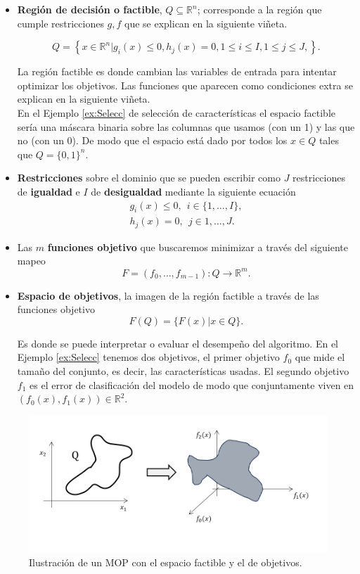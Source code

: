 \begin{itemize}
    \item \textbf{Región de decisión o factible}, $Q\subseteq \mathbb{R}^n$; corresponde a la región que cumple restricciones $g,f$ que se explican en la siguiente viñeta. 
    
    $$ Q=\left\{x\in \mathbb{R}^n|g_i(x)\leq 0, h_j(x)=0 , 1\leq i \leq I, 1\leq j \leq J,\right\}.$$ 

    La región factible es donde cambian las variables de entrada para intentar optimizar los objetivos. Las funciones que aparecen como condiciones extra se explican en la siguiente viñeta.\\ En el Ejemplo \ref{ex:Selecc} de selección de características  el espacio factible sería una máscara binaria sobre las columnas que usamos (con un 1) y las que no (con un 0). De modo que el espacio está dado por todos los $x\in Q$ tales que  $Q=\{0,1\}^n$.
    \item \textbf{Restricciones} sobre el dominio que se pueden escribir como $J$ restricciones de \textbf{igualdad} e $I$ de \textbf{desigualdad} mediante la siguiente ecuación  
    \begin{align*}
        g_i(x)\leq 0, \ \ i\in\{1,\ldots,I\},\\  h_j(x)=0 ,\ \ j\in{1,\ldots,J}.
    \end{align*} 
    \item Las $m$ \textbf{funciones objetivo} que buscaremos minimizar a través del siguiente mapeo$$ F=(f_0,\ldots,f_{m-1}):Q\rightarrow \mathbb{R}^m. $$
    \item \textbf{Espacio de objetivos}, la imagen de la región factible a través de las funciones objetivo 
     $$F(Q)=\{F(x) | x \in Q\}.$$
     
    Es donde se puede interpretar o evaluar el desempeño del algoritmo. En el Ejemplo \ref{ex:Selecc} tenemos dos objetivos, el primer objetivo $f_0$ que mide el tamaño del conjunto, es decir, las características usadas. El segundo objetivo $f_1$ es el error de clasificación del modelo de modo que conjuntamente viven en $(f_0(x),f_1(x))\in \mathbb{R}^2$.
    
\end{itemize}

\begin{figure}[H]
    \centering
    \includegraphics[width=\textwidth]{Figuras/obj_dec.png}
    \caption[Ilustración de un MOP]{Ilustración de un MOP con el espacio factible y el de objetivos. }
    \label{fig:dec_obj}
\end{figure}

